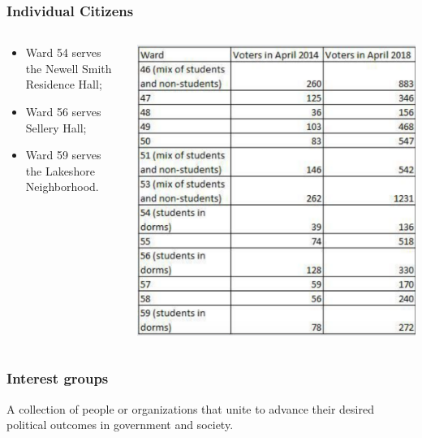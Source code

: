 \documentclass[aspectratio=169]{beamer}
\theoremstyle{principle}
\begin{document}
\begin{frame}
\frametitle{Individual Citizens}
\begin{columns}

\begin{column}{0.5\textwidth}
\begin{itemize}
\item Ward 54 serves the Newell Smith Residence Hall;
\bigskip
\bigskip
\item Ward 56 serves Sellery Hall;
\bigskip
\bigskip
\item Ward 59 serves the Lakeshore Neighborhood.
\end{itemize}
\end{column}
\begin{column}{0.5\textwidth}  %

    \begin{center}
     \includegraphics[scale=0.38]{UW_voting.png}
     \end{center}
     \end{column}
     \end{columns}
\end{frame}

\begin{frame}
\frametitle{Interest groups}
\begin{center}
\Large A collection of people or organizations that unite to advance their desired political outcomes in government and society.
\end{center}
\end{frame}
\end{document}
